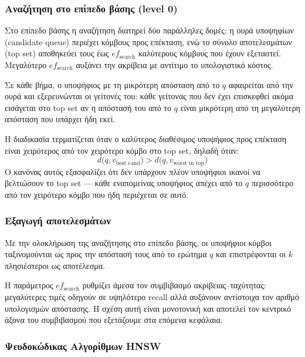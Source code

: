 \documentclass[12pt,a4paper]{article}
\begin{document}
\subsubsection{Αναζήτηση στο επίπεδο βάσης (level 0)}
Στο επίπεδο βάσης η αναζήτηση διατηρεί δύο παράλληλες δομές: η ουρά υποψηφίων (candidate queue) περιέχει κόμβους προς επέκταση, ενώ το σύνολο αποτελεσμάτων (top set) αποθηκεύει τους έως $ef_{\text{search}}$ καλύτερους κόμβους που έχουν εξεταστεί. Μεγαλύτερο $ef_{\text{search}}$ αυξάνει την ακρίβεια με αντίτιμο το υπολογιστικό κόστος.

Σε κάθε βήμα, ο υποψήφιος με τη μικρότερη απόσταση από το $q$ αφαιρείται από την ουρά και εξερευνώνται οι γείτονές του: κάθε γείτονας που δεν έχει επισκεφθεί ακόμα εισάγεται στο top set αν η απόστασή του από το $q$ είναι μικρότερη από τη μεγαλύτερη απόσταση που υπάρχει ήδη εκεί.

Η διαδικασία τερματίζεται όταν ο καλύτερος διαθέσιμος υποψήφιος προς επέκταση είναι χειρότερος από τον χειρότερο κόμβο στο top set, δηλαδή όταν:
\[
d\bigl(q,v_{\text{best cand}}\bigr) > d\bigl(q,v_{\text{worst in top}}\bigr)
\]
Ο κανόνας αυτός εξασφαλίζει ότι δεν υπάρχουν πλέον υποψήφιοι ικανοί να βελτιώσουν το top set --- κάθε εναπομείνας υποψήφιος απέχει από το $q$ περισσότερο από τον χειρότερο κόμβο που ήδη περιέχεται σε αυτό.

\subsubsection{Εξαγωγή αποτελεσμάτων}
Με την ολοκλήρωση της αναζήτησης στο επίπεδο βάσης, οι υποψήφιοι κόμβοι ταξινομούνται ως προς την απόστασή τους από το ερώτημα $q$ και επιστρέφονται οι $k$ πλησιέστεροι ως αποτέλεσμα.

Η παράμετρος $ef_{\text{search}}$ ρυθμίζει άμεσα τον συμβιβασμό ακρίβειας--ταχύτητας: μεγαλύτερες τιμές οδηγούν σε υψηλότερο recall αλλά αυξάνουν αντίστοιχα τον αριθμό υπολογισμών απόστασης. Η σχέση αυτή είναι μονοτονική και αποτελεί τον κεντρικό άξονα του συμβιβασμού που εξετάζουμε στα επόμενα κεφάλαια.

\subsubsection{Ψευδοκώδικας Αλγορίθμων HNSW}
\end{document}
